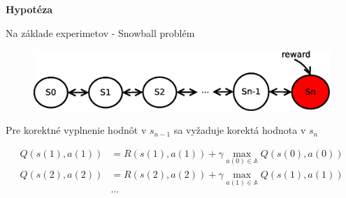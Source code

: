 \documentclass[xcolor=dvipsnames]{beamer}
\begin{document}
\begin{frame}{\bf Hypotéza}

Na základe experimetov - Snowball problém

\begin{figure}[!htb]
\includegraphics[scale=.5]{../diagrams/q_chain_problem.eps}
\end{figure}

Pre korektné vyplnenie hodnôt v $s_{n-1}$ sa vyžaduje korektá hodnota v $s_{n}$

\begin{align*}
    Q(s(1),a(1)) &= R(s(1),a(1)) + \gamma \max_{a(0) \in \mathbb{A}} Q(s(0), a(0)) \\
    Q(s(2),a(2)) &= R(s(2),a(2)) + \gamma \max_{a(1) \in \mathbb{A}} Q(s(1), a(1)) \\
    & \dots
\end{align*}

\end{frame}
\end{document}
